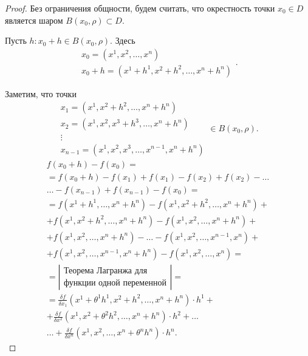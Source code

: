 \begin{proof}
    Без ограничения общности, будем считать, что окрестность точки $ x_0\in D $ является шаром $ B(x_0,\rho)\subset D $.

    Пусть $ h:x_0+h \in B(x_0,\rho) $. Здесь
    \[
        \begin{array}{l}
            x_0 = (x^1,x^2,\ldots,x^n) \\
            x_0 + h = (x^1 + h^1,x^2 + h^2,\ldots,x^n+h^n)
        \end{array}.
    \]

    Заметим, что точки
    \[
        \begin{array}{l}
            x_1 = (x^1,x^2+h^2,\ldots,x^n+h^n)       \\
            x_2 = (x^1,x^2,x^3 + h^3,\ldots,x^n+h^n) \\
            \vdots                                   \\
            x_{n-1} = (x^1,x^2,x^3,\ldots,x^{n-1},x^n+h^n)
        \end{array} \in B(x_0,\rho).
    \]
    \begin{multline*}
        f(x_0 + h) - f(x_0) = \\
        = f(x_0 + h) - f(x_1) + f(x_1) - f(x_2) + f(x_2) - \ldots\\
        \ldots - f(x_{n-1}) + f(x_{n-1}) - f(x_0) = \\
        = f(x^1 + h^1, \ldots,  x^n + h^n) - f(x^1, x^2 + h^2,  \ldots,  x^n + h^n) + \\
        + f(x^1,  x^2 + h^2,  \ldots,  x^n + h^n) - f(x^1,  x^2,  \ldots,  x^n + h^n) + \\
        + f(x^1,  x^2,  \ldots,  x^n + h^n) - \ldots - f(x^1,  x^2,  \ldots,  x^{n-1},  x^n) + \\
        + f(x^1,  x^2,  \ldots,  x^{n-1},  x^n + h^n) - f(x^1,  x^2,  \ldots,  x^n) = \\
        = \left|\begin{array}{c}
            \text{Теорема Лагранжа для} \\
            \text{функции одной переменной}
        \end{array}\right| = \\
        = \frac{\delta f}{\delta x_1}(x^1 + \theta^1 h^1,  x^2 + h^2,  \ldots,  x^n + h^n) \cdot h^1 + \\
        + \frac{\delta f}{\delta x^2}(x^1,  x^2 + \theta^2 h^2,  \ldots,  x^n + h^n) \cdot h^2 + \ldots \\
        \ldots + \frac{\delta f}{\delta x^n}(x^1,  x^2,  \ldots,  x^n + \theta^n h^n) \cdot h^n.
    \end{multline*}


\end{proof}
